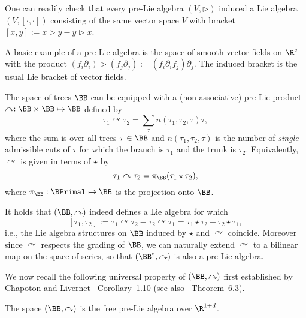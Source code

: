 \documentclass{article}
\begin{document}
One can readily check that every pre-Lie algebra $(V, \triangleright)$ induced a Lie algebra $(V, [\cdot,\cdot])$ consisting of the same vector space $V$ with bracket $[x,y] := x\triangleright y - y\triangleright x$.

\begin{example}\label{example:vectfieldsPreLie}
A basic example of a pre-Lie algebra is the space of smooth vector fields on $\R^e$ with the product $(f_i \partial_i) \triangleright (f_j\partial_j) := (f_i \partial_i f_j) \partial_j$. The induced bracket is the usual Lie bracket of vector fields.
\end{example} 


The space of trees $\BB$ can be equipped with a (non-associative) pre-Lie product $\curvearrowright : \BB \times \BB \mapsto \BB$ defined by
\[
\tau_1 \curvearrowright \tau_2 = \sum_{\tau} n(\tau_1,\tau_2,\tau)\tau,
\]
where the sum is over all trees $\tau \in \BB$ and $n(\tau_1,\tau_2,\tau)$ is the number of \emph{single} admissible cuts of $\tau$ for which the branch is $\tau_1$ and the trunk is $\tau_2$.
Equivalently, $\curvearrowright$ is given in terms of $\star$ by
 \[
\tau_1 \curvearrowright \tau_2 = \pi_{\BB}(\tau_1 \star \tau_2),
\]
where $\pi_\BB : \BPrimal \mapsto \BB$ is the projection onto $\BB$.

It holds that $(\BB,\curvearrowright)$ indeed defines a Lie algebra for which
\[
[\tau_1,\tau_2] := \tau_1 \curvearrowright \tau_2 - \tau_2 \curvearrowright \tau_1 = \tau_1 \star \tau_2 - \tau_2 \star \tau_1, 
\]
i.e., the Lie algebra structures on $\BB$ induced by $\star$ and $\curvearrowright$ coincide. Moreover since $\curvearrowright$ respects the grading of $\BB$, we can naturally extend $\curvearrowright$ to a bilinear map on the space of series, so that $(\BB^*, \curvearrowright)$ is also a pre-Lie algebra.


We now recall the following universal property of $(\BB, \curvearrowright)$ first established by Chapoton and Livernet~\cite{Chapoton01} Corollary~1.10 (see also~\cite{Dzhumadildaev02} Theorem~6.3).

\begin{theorem}\label{thm:freePreLie}
The space $(\BB, \curvearrowright)$ is the free pre-Lie algebra over $\R^{1+d}$.
\end{theorem}
\end{document}
